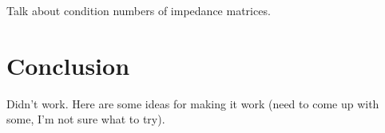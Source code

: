 \documentclass[etd,oneside,senior]{BYUPhys}
\begin{document}
Talk about condition numbers of impedance matrices.







\chapter{Conclusion}\label{chap:conclusion}

Didn't work. Here are some ideas for making it work (need to come up with some, I'm not sure what to try).






\end{document}
